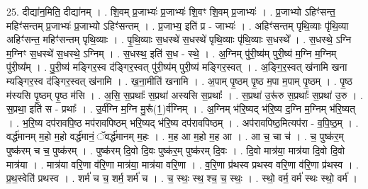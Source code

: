 \documentclass[17pt]{extarticle}
\begin{document}
25. दीद्या॑न॒मिति॒ दीद्या॑नम् । . शि॒वम् प्र॒जाभ्यः॑ प्र॒जाभ्यः॑ शि॒वꣳ शि॒वम् प्र॒जाभ्यः॑ । . प्र॒जाभ्यो ऽहिꣳ॑सन्त॒ महिꣳ॑सन्तम् प्र॒जाभ्यः॑ प्र॒जाभ्यो ऽहिꣳ॑सन्तम् । . प्र॒जाभ्य॒ इति॑ प्र - जाभ्यः॑ । . अहिꣳ॑सन्तम् पृथि॒व्याः पृ॑थि॒व्या अहिꣳ॑सन्त॒ महिꣳ॑सन्तम् पृथि॒व्याः । . पृ॒थि॒व्याः स॒धस्थे॑ स॒धस्थे॑ पृथि॒व्याः पृ॑थि॒व्याः स॒धस्थे᳚ । . स॒धस्थे॒ ऽग्नि म॒ग्निꣳ स॒धस्थे॑ स॒धस्थे॒ ऽग्निम् । . स॒धस्थ॒ इति॑ स॒ध - स्थे॒ । . अ॒ग्निम् पु॑री॒ष्य॑म् पुरी॒ष्य॑ म॒ग्नि म॒ग्निम् पु॑री॒ष्य᳚म् । . पु॒री॒ष्य॑ मङ्गिर॒स्व द॑ङ्गिर॒स्वत् पु॑री॒ष्य॑म् पुरी॒ष्य॑ मङ्गिर॒स्वत् । . अ॒ङ्गि॒र॒स्वत् ख॑नामि खना म्यङ्गिर॒स्व द॑ङ्गिर॒स्वत् ख॑नामि । . ख॒ना॒मीति॑ खनामि । . अ॒पाम् पृ॒ष्ठम् पृ॒ष्ठ म॒पा म॒पाम् पृ॒ष्ठम् । . पृ॒ष्ठ म॑स्यसि पृ॒ष्ठम् पृ॒ष्ठ म॑सि । . अ॒सि॒ स॒प्रथाः᳚ स॒प्रथा॑ अस्यसि स॒प्रथाः᳚ । . स॒प्रथा॑ उ॒रू॑रु स॒प्रथाः᳚ स॒प्रथा॑ उ॒रु । . स॒प्रथा॒ इति॑ स - प्रथाः᳚ । . उ॒र्व॑ग्नि म॒ग्नि मु॒रू᳚(1॒)र्व॑ग्निम् । . अ॒ग्निम् भ॑रि॒ष्यद् भ॑रि॒ष्य द॒ग्नि म॒ग्निम् भ॑रि॒ष्यत् । . भ॒रि॒ष्य दप॑रावपि॒ष्ठ मप॑रावपिष्ठम् भरि॒ष्यद् भ॑रि॒ष्य दप॑रावपिष्ठम् । . अप॑रावपिष्ठ॒मित्यप॑रा - व॒पि॒ष्ठ॒म् । . वर्द्ध॑मानम् म॒हो म॒हो वर्द्ध॑मानं॒ ॅवर्द्ध॑मानम् म॒हः । . म॒ह आ म॒हो म॒ह आ । . आ च॒ चा च॑ । . च॒ पुष्क॑र॒म् पुष्क॑रम् च च॒ पुष्क॑रम् । . पुष्क॑रम् दि॒वो दि॒वः पुष्क॑र॒म् पुष्क॑रम् दि॒वः । . दि॒वो मात्र॑या॒ मात्र॑या दि॒वो दि॒वो मात्र॑या । . मात्र॑या वरि॒णा व॑रि॒णा मात्र॑या॒ मात्र॑या वरि॒णा । . व॒रि॒णा प्र॑थस्व प्रथस्व वरि॒णा व॑रि॒णा प्र॑थस्व । . प्र॒थ॒स्वेति॑ प्रथस्व । . शर्म॑ च च॒ शर्म॒ शर्म॑ च । . च॒ स्थः॒ स्थ॒ श्च॒ च॒ स्थः॒ । . स्थो॒ वर्म॒ वर्म॑ स्थः स्थो॒ वर्म॑ । \newline
\end{document}
